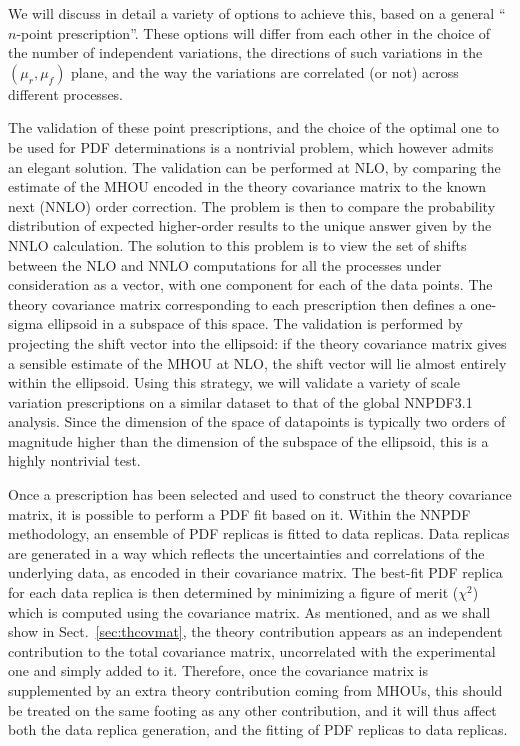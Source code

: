 We will discuss in detail a variety of options to achieve this, based on a general ``$n$-point prescription''.
%
These  options will differ from each other in the choice
of the number of independent variations, the directions of such
variations in the $(\mu_r,\mu_f)$ plane, and the way the variations
are correlated (or not) across different processes.

The validation of these point prescriptions, and the choice of the
optimal one to be used for PDF determinations is a nontrivial
problem, which however admits an elegant solution.
%
The validation can be performed at NLO, by comparing the estimate of the MHOU encoded in the theory covariance matrix to the known next (NNLO)
order correction. The problem is then to compare the probability
distribution of expected higher-order results to the unique answer given by the NNLO calculation.
%
The solution to this problem is to view the set
of shifts between the NLO and NNLO computations for all the processes under
consideration as a vector, with one component for each 
of the data points. The theory
covariance matrix corresponding to each prescription then defines a
one-sigma ellipsoid in a subspace of this space.
%
The validation is performed by projecting the shift vector into the ellipsoid: if the theory covariance matrix gives a sensible estimate of the MHOU at NLO, the shift vector will lie almost entirely within the ellipsoid.
%
Using this strategy, we will validate a variety of scale variation prescriptions
on a similar dataset to that of the global NNPDF3.1 analysis.
%
Since the dimension of the space of datapoints is typically two orders of magnitude higher than the dimension of the subspace of the ellipsoid, this is a highly nontrivial test.

Once a prescription has been selected and used to construct the theory
covariance matrix, it is possible to perform a PDF fit based
on it.
Within the NNPDF methodology, an ensemble of PDF replicas is fitted to data
replicas.
%
Data replicas are generated in a way which reflects the
uncertainties and correlations of the underlying data, as encoded in
their covariance matrix.
%
The best-fit PDF replica for each data
replica is then determined by minimizing a figure of merit ($\chi^2$) which
is computed using the covariance matrix.
%
As mentioned, and as we shall show in
Sect.~\ref{sec:thcovmat}, the theory contribution
appears as an independent contribution to the total covariance matrix,
uncorrelated with the experimental one and simply added to
it.
%
Therefore,  once the
covariance matrix is supplemented by an extra theory contribution coming 
from MHOUs, this should be treated on the same footing as any other
contribution, and it will thus affect both the data replica generation, and
the fitting of PDF replicas to data replicas.

